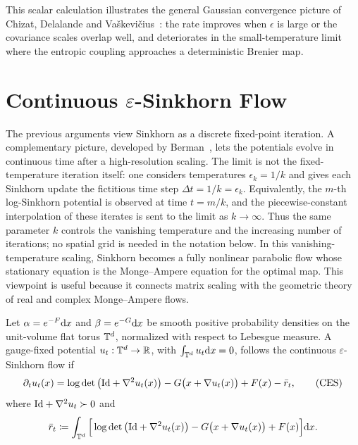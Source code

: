 This scalar calculation illustrates the general Gaussian convergence picture of Chizat, Delalande and Va\v{s}kevi\v{c}ius~\cite{chizat2024sharper}: the rate improves when $\epsilon$ is large or the covariance scales overlap well, and deteriorates in the small-temperature limit where the entropic coupling approaches a deterministic Brenier map.



\section{Continuous \texorpdfstring{$\varepsilon$}{epsilon}-Sinkhorn Flow}\label{sec-continuous-epsilon-sinkhorn}

The previous arguments view Sinkhorn as a discrete fixed-point iteration.  A complementary picture, developed by Berman~\cite{berman2017sinkhorn}, lets the potentials evolve in continuous time after a high-resolution scaling.  The limit is not the fixed-temperature iteration itself: one considers temperatures $\epsilon_k=1/k$ and gives each Sinkhorn update the fictitious time step $\Delta t=1/k=\epsilon_k$.  Equivalently, the $m$-th log-Sinkhorn potential is observed at time $t=m/k$, and the piecewise-constant interpolation of these iterates is sent to the limit as $k\to\infty$.  Thus the same parameter $k$ controls the vanishing temperature and the increasing number of iterations; no spatial grid is needed in the notation below.  In this vanishing-temperature scaling, Sinkhorn becomes a fully nonlinear parabolic flow whose stationary equation is the Monge--Ampere equation for the optimal map.  This viewpoint is useful because it connects matrix scaling with the geometric theory of real and complex Monge--Ampere flows.

\begin{defn}\label{def-continuous-epsilon-sinkhorn}
	Let $\alpha=e^{-F}\mathrm{d} x$ and $\beta=e^{-G}\mathrm{d} x$ be smooth positive probability densities on the unit-volume flat torus $\mathbb{T}^d$, normalized with respect to Lebesgue measure.  A gauge-fixed potential $u_t:\mathbb{T}^d\to\mathbb{R}$, with $\int_{\mathbb{T}^d}u_t\mathrm{d} x=0$, follows the continuous \(\varepsilon\)-Sinkhorn flow if
	\[
		\partial_t u_t(x)
		=
		\log\det\big(\mathrm{Id}+\nabla^2 u_t(x)\big)
		-G\big(x+\nabla u_t(x)\big)+F(x)-\bar r_t,
		\tag{CES}
	\]
	where $\mathrm{Id}+\nabla^2u_t\succ0$ and
	\[
		\bar r_t \coloneqq
		\int_{\mathbb{T}^d}
		\Big[
		\log\det\big(\mathrm{Id}+\nabla^2 u_t(x)\big)
		-G\big(x+\nabla u_t(x)\big)+F(x)
		\Big]\mathrm{d} x .
	\]
\end{defn}

